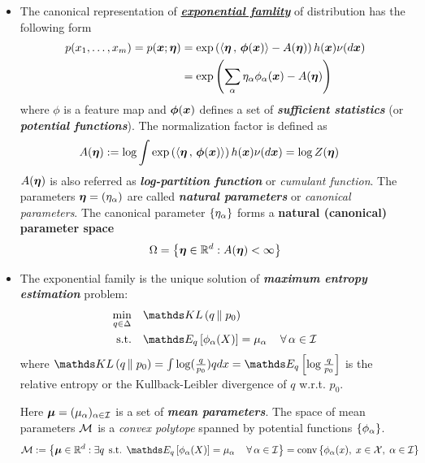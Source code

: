 \documentclass[11pt]{article}
\begin{document}
\begin{itemize}
\item The canonical representation of \underline{\emph{\textbf{exponential famlity}}} of distribution has the following form
\begin{align}
p(x_1, \ldots, x_{m}) = p(\boldsymbol{x}; \boldsymbol{\eta}) &= \exp\left(\left\langle \boldsymbol{\eta}\,,\, \boldsymbol{\phi}(\boldsymbol{x}) \right\rangle - A(\boldsymbol{\eta})\right)h(\boldsymbol{x})\nu(d\boldsymbol{x}) \nonumber \\
&= \exp\left(\sum_{\alpha}\eta_{\alpha}\phi_{\alpha}(\boldsymbol{x}) -  A(\boldsymbol{\eta})\right) \label{eqn: exp_fam}
\end{align} where $\phi$ is a feature map  and $\boldsymbol{\phi}(\boldsymbol{x})$ defines a set of \emph{\textbf{sufficient statistics}} (or \emph{\textbf{potential functions}}). The normalization factor is defined as
\begin{align*}
 A(\boldsymbol{\eta}) &:= \log \int \exp\left( \left\langle \boldsymbol{\eta}\,,\, \boldsymbol{\phi}(\boldsymbol{x}) \right\rangle \right)h(\boldsymbol{x})\nu(d\boldsymbol{x}) = \log Z(\boldsymbol{\eta})
\end{align*} $A(\boldsymbol{\eta})$ is also referred as \textbf{\emph{log-partition function}} or \emph{cumulant function}. The parameters $\boldsymbol{\eta} = (\eta_{\alpha})$ are called \textbf{\emph{natural parameters}}  or \emph{canonical parameters}. The canonical parameter $\left\{\eta_{\alpha}\right\}$ forms a \textbf{natural (canonical) parameter space}
\begin{align}
\Omega = \left\{\boldsymbol{\eta} \in {\mathbb R}^{d}: A(\boldsymbol{\eta}) < \infty\right\} \label{eqn: canonical_space}
\end{align}

\item The exponential family is the unique solution of \textbf{\emph{maximum entropy estimation}} problem:
\begin{align}
\min_{q \in \Delta}&\quad \kl{q}{p_{0}} \label{eqn: max_ent}\\
\text{s.t.}&\quad \E{q}{\phi_{\alpha}(X)} = \mu_{\alpha}\,\quad  \forall\, \alpha \in \cI   \label{eqn: max_ent_mean_constraint}
\end{align} where $\kl{q}{p_0} = \int \log(\frac{q}{p_0}) q dx = \E{q}{\log\frac{q}{p_0}}$ is the relative entropy or the Kullback-Leibler divergence of $q$ w.r.t. $p_0$.

Here $\boldsymbol{\mu} = (\mu_{\alpha})_{\alpha \in {\mathcal I}}$ is a set of  \textbf{\emph{mean parameters}}. The space of mean parameters ${\mathcal M}$ is a \emph{convex polytope} spanned by potential functions $\left\{\phi_{\alpha}\right\}$.
\begin{align}
\cM &:= \set{\mb{\mu} \in \bR^d: \exists q\,\; \text{s.t. } \E{q}{\phi_{\alpha}(X)} = \mu_{\alpha}\,\quad  \forall\, \alpha \in \cI} = \text{conv}\set{\phi_{\alpha}(x),\; x\in \cX, \;\alpha \in \cI}  \label{eqn: marginal_polytope}
\end{align}


\end{itemize}
\end{document}
